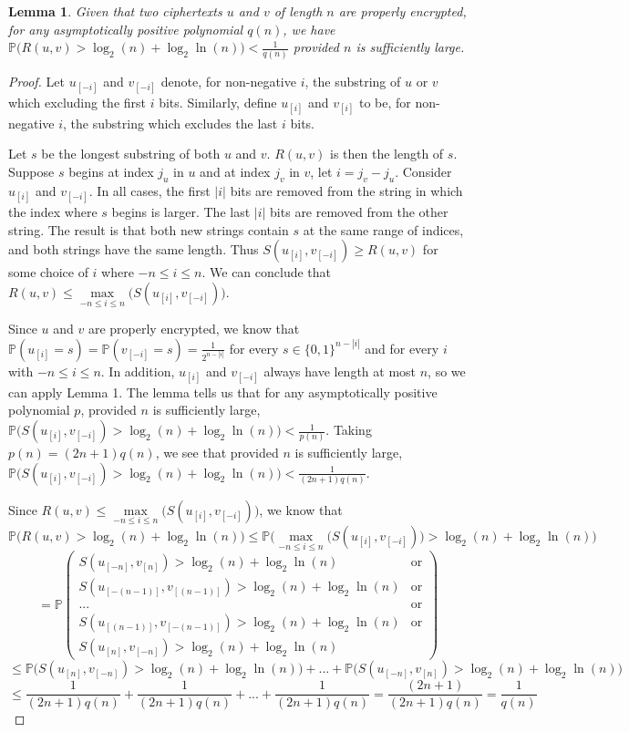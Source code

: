 \documentclass[11pt]{article}
\newtheorem{Lemma}{Lemma}
\begin{document}
\begin{Lemma}
Given that two ciphertexts $u$ and $v$ of length $n$ are properly encrypted, for any asymptotically positive polynomial $q(n)$, we have $\mathbb{P}\bigg( R(u,v) > \log_2(n)+\log_2\ln(n)\bigg) < \frac{1}{q(n)}$ provided $n$ is sufficiently large.
\end{Lemma}\begin{proof}
Let $u_{[-i]}$ and $v_{[-i]}$ denote, for non-negative $i$, the substring of $u$ or $v$ which excluding the first $i$ bits. Similarly, define $u_{[i]}$ and $v_{[i]}$ to be, for non-negative $i$, the substring which excludes the last $i$ bits. 

Let $s$ be the longest substring of both $u$ and $v$. $R(u,v)$ is then the length of $s$. Suppose $s$ begins at index $j_u$ in $u$ and at index $j_v$ in $v$, let $i = j_v - j_u$. Consider $u_{[i]}$ and $v_{[-i]}$. In all cases, the first $|i|$ bits are removed from the string in which the index where $s$ begins is larger. The last $|i|$ bits are removed from the other string. The result is that both new strings contain $s$ at the same range of indices, and both strings have the same length. Thus $S(u_{[i]},v_{[-i]}) \ge R(u,v)$ for some choice of $i$ where $-n \le i \le n$. We can conclude that $R(u,v) \le \max\limits_{-n \le i \le n}\bigg(S(u_{[i]},v_{[-i]})\bigg)$. 

Since $u$ and $v$ are properly encrypted, we know that $\mathbb{P}(u_{[i]} = s) = \mathbb{P}(v_{[-i]} = s) = \frac{1}{2^{n-|i|}}$ for every $s \in \{0, 1\}^{n-|i|}$ and for every $i$ with $-n \le i \le n$. In addition, $u_{[i]}$ and $v_{[-i]}$ always have length at most $n$, so we can apply Lemma 1. The lemma tells us that for any asymptotically positive polynomial $p$, provided $n$ is sufficiently large, $\mathbb{P}\bigg( S(u_{[i]},v_{[-i]}) > \log_2(n)+\log_2\ln(n)\bigg) < \frac{1}{p(n)}$. Taking $p(n) = (2n+1)q(n)$, we see that provided $n$ is sufficiently large, $\mathbb{P}\bigg( S(u_{[i]},v_{[-i]}) > \log_2(n)+\log_2\ln(n)\bigg) < \frac{1}{(2n+1)q(n)}$.

Since $R(u,v) \le \max\limits_{-n \le i \le n}\bigg(S(u_{[i]},v_{[-i]})\bigg)$, we know that 
$$\mathbb{P}\bigg(R(u,v)> \log_2(n)+\log_2\ln(n)\bigg) \le \mathbb{P}\bigg( \max\limits_{-n \le i \le n}\bigg(S(u_{[i]},v_{[-i]})\bigg) > \log_2(n)+\log_2\ln(n)\bigg)$$
$$=\mathbb{P}\left(\begin{matrix} S(u_{[-n]},v_{[n]}) > \log_2(n)+\log_2\ln(n) & \text{or} \\ S(u_{[-(n - 1)]},v_{[(n-1)]}) > \log_2(n)+\log_2\ln(n) & \text{or} \\ ... & \text{or}\\ S(u_{[(n - 1)]},v_{[-(n-1)]}) > \log_2(n)+\log_2\ln(n) & \text{or} \\ S(u_{[n]},v_{[-n]}) > \log_2(n)+\log_2\ln(n)  \end{matrix}\right)$$
$$\le \mathbb{P}\bigg( S(u_{[n]},v_{[-n]}) > \log_2(n)+\log_2\ln(n)\bigg) + ... + \mathbb{P}\bigg( S(u_{[-n]},v_{[n]}) > \log_2(n)+\log_2\ln(n)\bigg)$$
$$\le \frac{1}{(2n+1)q(n)} + \frac{1}{(2n+1)q(n)} + ... + \frac{1}{(2n+1)q(n)} = \frac{(2n+1)}{(2n+1)q(n)} = \frac{1}{q(n)}$$


\end{proof}
\end{document}
